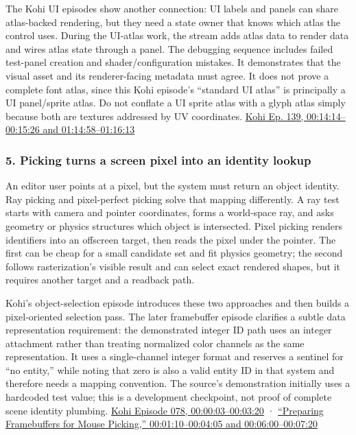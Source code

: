 The Kohi UI episodes show another connection: UI labels and panels can share atlas-backed rendering, but they need a state owner that knows which atlas the control uses. During the UI-atlas work, the stream adds atlas data to render data and wires atlas state through a panel. The debugging sequence includes failed test-panel creation and shader/configuration mistakes. It demonstrates that the visual asset and its renderer-facing metadata must agree. It does not prove a complete font atlas, since this Kohi episode's ``standard UI atlas'' is principally a UI panel/sprite atlas. Do not conflate a UI sprite atlas with a glyph atlas simply because both are textures addressed by UV coordinates. \href{https://www.youtube.com/watch?v=-V5z1bVjl_c&t=14m14s}{Kohi Ep. 139, 00:14:14--00:15:26 and 01:14:58--01:16:13}

\subsubsection{5. Picking turns a screen pixel into an identity lookup}\label{picking-turns-a-screen-pixel-into-an-identity-lookup}

An editor user points at a pixel, but the system must return an object identity. Ray picking and pixel-perfect picking solve that mapping differently. A ray test starts with camera and pointer coordinates, forms a world-space ray, and asks geometry or physics structures which object is intersected. Pixel picking renders identifiers into an offscreen target, then reads the pixel under the pointer. The first can be cheap for a small candidate set and fit physics geometry; the second follows rasterization's visible result and can select exact rendered shapes, but it requires another target and a readback path.

Kohi's object-selection episode introduces these two approaches and then builds a pixel-oriented selection pass. The later framebuffer episode clarifies a subtle data representation requirement: the demonstrated integer ID path uses an integer attachment rather than treating normalized color channels as the same representation. It uses a single-channel integer format and reserves a sentinel for ``no entity,'' while noting that zero is also a valid entity ID in that system and therefore needs a mapping convention. The source's demonstration initially uses a hardcoded test value; this is a development checkpoint, not proof of complete scene identity plumbing. \href{https://www.youtube.com/watch?v=mx1TyxNFrdo&t=3s}{Kohi Episode 078, 00:00:03--00:03:20} · \href{https://www.youtube.com/watch?v=wYVaIOUhz6s&t=1m10s}{``Preparing Framebuffers for Mouse Picking,'' 00:01:10--00:04:05 and 00:06:00--00:07:20}

